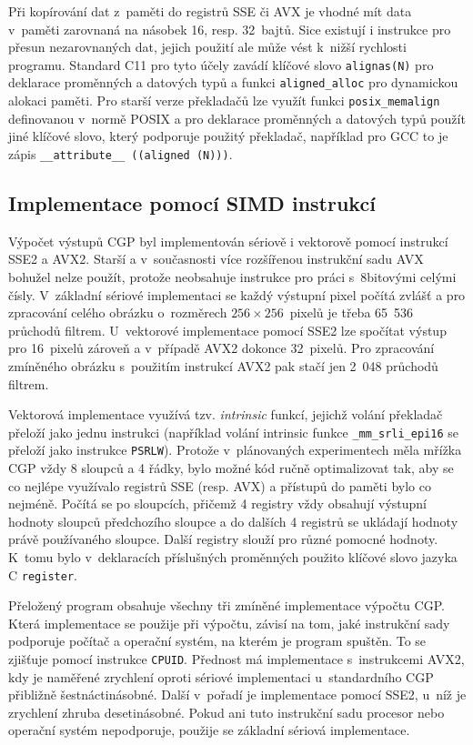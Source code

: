 Při kopírování dat z~paměti do registrů SSE či AVX je vhodné mít data v~paměti zarovnaná na násobek 16, resp. 32~bajtů. Sice existují i instrukce pro přesun nezarovnaných dat, jejich použití ale může vést k~nižší rychlosti programu. Standard C11 pro tyto účely zavádí klíčové slovo \texttt{alignas(N)} pro deklarace proměnných a datových typů a funkci \texttt{aligned\_alloc} pro dynamickou alokaci paměti. Pro starší verze překladačů lze využít funkci \texttt{posix\_memalign} definovanou v~normě POSIX a pro deklarace proměnných a datových typů použít jiné klíčové slovo, který podporuje použitý překladač, například pro GCC to je zápis \texttt{\_\_attribute\_\_~((aligned~(N)))}.

\subsection{Implementace pomocí SIMD instrukcí}

Výpočet výstupů CGP byl implementován sériově i vektorově pomocí instrukcí SSE2 a AVX2. Starší a v~současnosti více rozšířenou instrukční sadu AVX bohužel nelze použít, protože neobsahuje instrukce pro práci s~8bitovými celými čísly. V~základní sériové implementaci se každý výstupní pixel počítá zvlášť a pro zpracování celého obrázku o~rozměrech $256\times256$~pixelů je třeba 65~536 průchodů filtrem. U~vektorové implementace pomocí SSE2 lze spočítat výstup pro 16~pixelů zároveň a v~případě AVX2 dokonce 32~pixelů. Pro zpracování zmíněného obrázku s~použitím instrukcí AVX2 pak stačí jen 2~048 průchodů filtrem.

Vektorová implementace využívá tzv. \emph{intrinsic} funkcí, jejichž volání překladač přeloží jako jednu instrukci (například volání intrinsic funkce \texttt{\_mm\_srli\_epi16} se přeloží jako instrukce \texttt{PSRLW}). Protože v~plánovaných experimentech měla mřížka CGP vždy 8 sloupců a 4 řádky, bylo možné kód ručně optimalizovat tak, aby se co nejlépe využívalo registrů SSE (resp. AVX) a přístupů do paměti bylo co nejméně. Počítá se po sloupcích, přičemž 4 registry vždy obsahují výstupní hodnoty sloupců předchozího sloupce a do dalších 4 registrů se ukládají hodnoty právě používaného sloupce. Další registry slouží pro různé pomocné hodnoty. K~tomu bylo v~deklaracích příslušných proměnných použito klíčové slovo jazyka C \texttt{register}.

Přeložený program obsahuje všechny tři zmíněné implementace výpočtu CGP. Která implementace se použije při výpočtu, závisí na tom, jaké instrukční sady podporuje počítač a operační systém, na kterém je program spuštěn. To se zjišťuje pomocí instrukce \texttt{CPUID}. Přednost má implementace s~instrukcemi AVX2, kdy je naměřené zrychlení oproti sériové implementaci u~standardního CGP přibližně šestnáctinásobné. Další v~pořadí je implementace pomocí SSE2, u~níž je zrychlení zhruba desetinásobné. Pokud ani tuto instrukční sadu procesor nebo operační systém nepodporuje, použije se základní sériová implementace.

